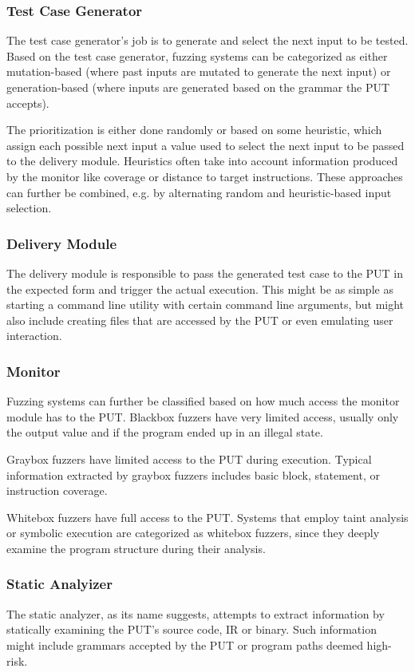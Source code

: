 \documentclass{article}
\begin{document}
\begin{multicols}{2}
    \subsubsection{Test Case Generator}
    The test case generator's job is to generate and select the next input to be tested. Based on the test case generator, fuzzing systems can be categorized as either mutation-based (where past inputs are mutated to generate the next input) or generation-based (where inputs are generated based on the grammar the PUT accepts).

    The prioritization is either done randomly or based on some heuristic, which assign each possible next input a value used to select the next input to be passed to the delivery module. Heuristics often take into account information produced by the monitor like coverage or distance to target instructions. These approaches can further be combined, e.g. by alternating random and heuristic-based input selection.

    \subsubsection{Delivery Module}
    The delivery module is responsible to pass the generated test case to the PUT in the expected form and trigger the actual execution. This might be as simple as starting a command line utility with certain command line arguments, but might also include creating files that are accessed by the PUT or even emulating user interaction.

    \subsubsection{Monitor}
    Fuzzing systems can further be classified based on how much access the monitor module has to the PUT. Blackbox fuzzers have very limited access, usually only the output value and if the program ended up in an illegal state.

    Graybox fuzzers have limited access to the PUT during execution. Typical information extracted by graybox fuzzers includes basic block, statement, or instruction coverage.

    Whitebox fuzzers have full access to the PUT. Systems that employ taint analysis or symbolic execution are categorized as whitebox fuzzers, since they deeply examine the program structure during their analysis.

    \subsubsection{Static Analyizer}
    The static analyzer, as its name suggests, attempts to extract information by statically examining the PUT's source code, IR or binary. Such information might include grammars accepted by the PUT or program paths deemed high-risk.


\end{multicols}
\end{document}
